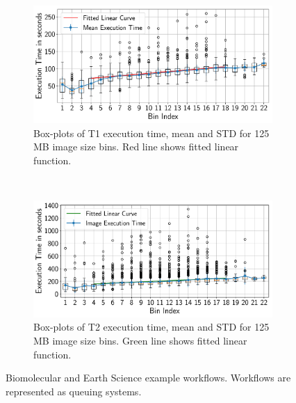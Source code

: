 \begin{figure}[ht!]
    \centering
    \begin{subfigure}[b]{0.45\textwidth}
        \includegraphics[width=\linewidth]{figures/stage_0_tx_box.pdf}
        \caption{Box-plots of T1 execution time, mean and STD for 125 MB image size bins. Red line shows fitted linear function.}
    \end{subfigure}%
    ~ 
    \begin{subfigure}[b]{0.45\textwidth}
        \includegraphics[width=\linewidth]{figures/stage_1_tx_box.pdf}
        \caption{Box-plots of T2 execution time, mean and STD for 125 MB image size bins. Green line shows fitted linear function.}
    \end{subfigure}
    \caption{Biomolecular and Earth Science example workflows. Workflows are represented as queuing systems.}
    \label{fig:sealfitting}
\end{figure}